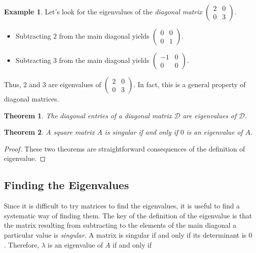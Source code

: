 \documentclass[a4paper,11pt]{article}
\theoremstyle{definition}
\newtheorem{example}{Example}
\theoremstyle{plain}
\newtheorem{theorem}{Theorem}
\begin{document}
\begin{example}
Let's look for the eigenvalues of the \emph{diagonal matrix} \(\begin{pmatrix} 2 & 0 \\ 0 & 3 \end{pmatrix}\).

\begin{itemize}
\item
  Subtracting \(2\) from the main diagonal yields
  \(\begin{pmatrix} 0 & 0 \\ 0 & 1 \end{pmatrix}\).
\item
  Subtracting \(3\) from the main diagonal yields
  \(\begin{pmatrix} -1 & 0 \\ 0 & 0 \end{pmatrix}\).
\end{itemize}

Thus, \(2\) and \(3\) are eigenvalues of
\(\begin{pmatrix} 2 & 0 \\ 0 & 3 \end{pmatrix}\). In fact, this is a
general property of diagonal matrices.
\end{example}

\begin{theorem}
The diagonal entries of a diagonal matrix \(\mathcal{D}\) are eigenvalues of \(\mathcal{D}\).
\end{theorem}

\begin{theorem}
A square matrix \(A\) is singular if and only if \(0\) is an eigenvalue of \(A\).
\end{theorem}

\begin{proof}
These two theorems are straightforward consequences of the definition of
eigenvalue.
\end{proof}

\subsection{Finding the Eigenvalues}\label{finding-the-eigenvalues}

Since it is difficult to try matrices to find the eigenvalues, it is
useful to find a systematic way of finding them. The key of the
definition of the eigenvalue is that the matrix resulting from
subtracting to the elements of the main diagonal a particular value is
\emph{singular}. A matrix is singular if and only if its determinant is
\(0\). Therefore, \(\lambda\) is an eigenvalue of \(A\) if and only if
\end{document}
